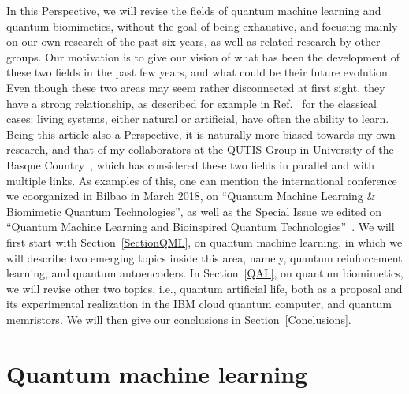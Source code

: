 \documentclass[12pt]{iopart}
\begin{document}
In this Perspective, we will revise the fields of quantum machine learning and quantum biomimetics, without the goal of being exhaustive, and focusing mainly on our own research of the past six years, as well as related research by other groups. Our motivation is to give our vision of what has been the development of these two fields in the past few years, and what could be their future evolution. Even though these two areas may seem rather disconnected at first sight, they have a strong relationship, as described for example in Ref.~\cite{alReview} for the classical cases: living systems, either natural or artificial, have often the ability to learn. Being this article also a Perspective, it is naturally more biased towards my own research, and that of my collaborators at the QUTIS Group in University of the Basque Country~\cite{QUTIS}, which has considered these two fields in parallel and with multiple links. As examples of this, one can mention the international conference we coorganized in Bilbao in March 2018, on ``Quantum Machine Learning \& Biomimetic Quantum Technologies'', as well as the Special Issue we edited on ``Quantum Machine Learning and Bioinspired Quantum Technologies''~\cite{SI_QML}. We will first start with Section~\ref{SectionQML}, on quantum machine learning, in which we will describe two emerging topics inside this area, namely, quantum reinforcement learning, and quantum autoencoders. In Section~\ref{QAL}, on quantum biomimetics, we will revise other two topics, i.e., quantum artificial life, both as a proposal and its experimental realization in the IBM cloud quantum computer, and quantum memristors. We will then give our conclusions in Section~\ref{Conclusions}.


\section{Quantum machine learning\label{SectionQML}}
\end{document}

